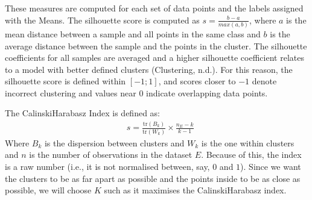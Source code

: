 \documentclass[letterpaper,10pt,english]{jupyterBook}
\begin{document}
\sphinxAtStartPar
These measures are computed for each set of data points and the labels assigned with the \sphinxhyphen{}Means. The silhouette score is computed as \(s = \frac{b - a}{max(a, b)}\), where \(a\) is the mean distance between a sample and all points in the same class and \(b\) is the average distance between the sample and the points in the  cluster. The silhouette coefficients for all samples are averaged and a higher silhouette coefficient relates to a model with better defined clusters (Clustering, n.d.). For this reason, the silhouette score is defined within \([-1;1]\), and scores closer to \(-1\) denote incorrect clustering and values near \(0\) indicate overlapping data points.

\sphinxAtStartPar
The Calinski\sphinxhyphen{}Harabasz Index is defined as:
\label{equation:04-stations_kmeans:7236fc86-f0c7-491b-9b76-7fb519d32501}\begin{align}
& s = \frac{\mathrm{tr}(B_k)}{\mathrm{tr}(W_k)} \times \frac{n_E - k}{k - 1}
\end{align}
\sphinxAtStartPar
Where \(B_k\) is the dispersion between clusters and \(W_k\) is the one within clusters and \(n\) is the number of observations in the dataset \(E\). Because of this, the index is a raw number (i.e., it is not normalised between, say, \(0\) and \(1\)). Since we want the clusters to be as far apart as possible and the points inside to be as close as possible, we will choose \(K\) such as it maximises the Calinski\sphinxhyphen{}Harabasz index.
\end{document}
